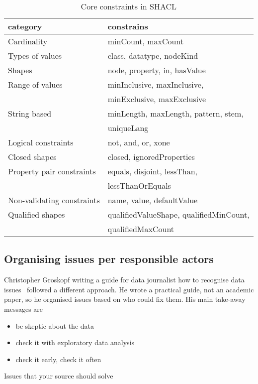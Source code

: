 \begin{table}[h]
\caption{Core constraints in SHACL}
\label{table:shacl}
\centering
\begin{tabular}{l|l}
category & constrains \\
\hline
Cardinality & minCount, maxCount \\
Types of values & class, datatype, nodeKind \\
Shapes & node, property, in, hasValue \\
Range of values & minInclusive, maxInclusive,\\
 &  minExclusive, maxExclusive  \\
String based & minLength, maxLength, pattern, stem,\\
 & uniqueLang \\
Logical constraints & not, and, or, xone \\
Closed shapes & closed, ignoredProperties \\
Property pair constraints & equals, disjoint, lessThan,\\
 & lessThanOrEquals \\
Non-validating constraints & name, value, defaultValue \\
Qualified shapes & qualifiedValueShape, qualifiedMinCount,\\  & qualifiedMaxCount \\
\end{tabular}
\end{table}

\subsection{Organising issues per responsible actors}

Christopher Groskopf writing a guide for data journalist how to recognise data issues~\cite{groskopf2015} followed a different approach. He wrote a practical guide, not an academic paper, so he organised issues based on who could fix them. His main take-away messages are
\begin{itemize}
 \setlength{\parskip}{0pt}
 \setlength{\itemsep}{0pt plus 1pt}
 \item be skeptic about the data
 \item check it with exploratory data analysis
 \item check it early, check it often
\end{itemize}

Issues that your source should solve

